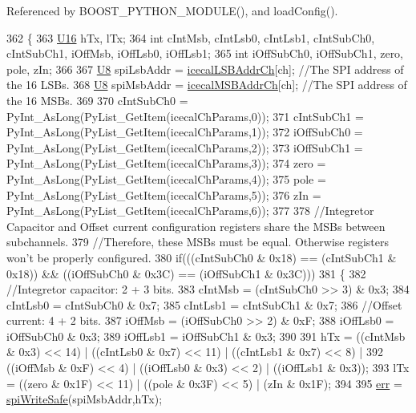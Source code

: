 Referenced by B\+O\+O\+S\+T\+\_\+\+P\+Y\+T\+H\+O\+N\+\_\+\+M\+O\+D\+U\+L\+E(), and load\+Config().


\begin{DoxyCode}
362 \{                            
363     \hyperlink{ICECALv3_8h_adf928e51a60dba0df29d615401cc55a8}{U16} hTx, lTx;
364     \textcolor{keywordtype}{int} cIntMsb, cIntLsb0, cIntLsb1, cIntSubCh0, cIntSubCh1, iOffMsb, iOffLsb0, iOffLsb1;
365     \textcolor{keywordtype}{int} iOffSubCh0, iOffSubCh1, zero, pole, zIn;
366 
367     \hyperlink{ICECALv3_8h_a3cb25ca6f51f003950f9625ff05536fc}{U8} spiLsbAddr = \hyperlink{ICECALv3_8h_abd124f50fa794b9b0aded801fabf5322}{icecalLSBAddrCh}[ch];           \textcolor{comment}{//The SPI address of the 16 LSBs.}
368     \hyperlink{ICECALv3_8h_a3cb25ca6f51f003950f9625ff05536fc}{U8} spiMsbAddr = \hyperlink{ICECALv3_8h_afba64a649cc9314882fd49b62b99d6e7}{icecalMSBAddrCh}[ch];           \textcolor{comment}{//The SPI address of the 16 MSBs.}
369 
370     cIntSubCh0 = PyInt\_AsLong(PyList\_GetItem(icecalChParams,0));
371     cIntSubCh1 = PyInt\_AsLong(PyList\_GetItem(icecalChParams,1));
372     iOffSubCh0 = PyInt\_AsLong(PyList\_GetItem(icecalChParams,2));
373     iOffSubCh1 = PyInt\_AsLong(PyList\_GetItem(icecalChParams,3));
374     zero             = PyInt\_AsLong(PyList\_GetItem(icecalChParams,4));
375     pole             = PyInt\_AsLong(PyList\_GetItem(icecalChParams,5));
376     zIn              = PyInt\_AsLong(PyList\_GetItem(icecalChParams,6));
377 
378     \textcolor{comment}{//Integretor Capacitor and Offset current configuration registers share the MSBs between subchannels.}
379     \textcolor{comment}{//Therefore, these MSBs must be equal. Otherwise registers won't be properly configured. }
380     \textcolor{keywordflow}{if}(((cIntSubCh0 & 0x18) == (cIntSubCh1 & 0x18)) && ((iOffSubCh0 & 0x3C) == (iOffSubCh1 & 0x3C)))
381     \{
382         \textcolor{comment}{//Integretor capacitor: 2 + 3 bits.}
383         cIntMsb  = (cIntSubCh0 >> 3) & 0x3;
384         cIntLsb0 =  cIntSubCh0 & 0x7;
385         cIntLsb1 =  cIntSubCh1 & 0x7;
386         \textcolor{comment}{//Offset current: 4 + 2 bits.}
387         iOffMsb  = (iOffSubCh0 >> 2) & 0xF;
388         iOffLsb0 =  iOffSubCh0 & 0x3;
389         iOffLsb1 =  iOffSubCh1 & 0x3;
390 
391         hTx =  ((cIntMsb & 0x3) << 14) | ((cIntLsb0 & 0x7) << 11) | ((cIntLsb1 & 0x7) << 8) | 
392                      ((iOffMsb & 0xF) << 4)  | ((iOffLsb0 & 0x3) << 2)  | ((iOffLsb1 & 0x3));
393         lTx =    ((zero & 0x1F) << 11)   | ((pole & 0x3F) << 5)     | (zIn & 0x1F);
394 
395                             \hyperlink{classICECALv3_ad8989925ee5b3ff322d863ce6aaff0bd}{err} = \hyperlink{classICECALv3_aa0b8358ea0be8e47a8aded5e1551787f}{spiWriteSafe}(spiMsbAddr,hTx);  

\end{DoxyCode}
